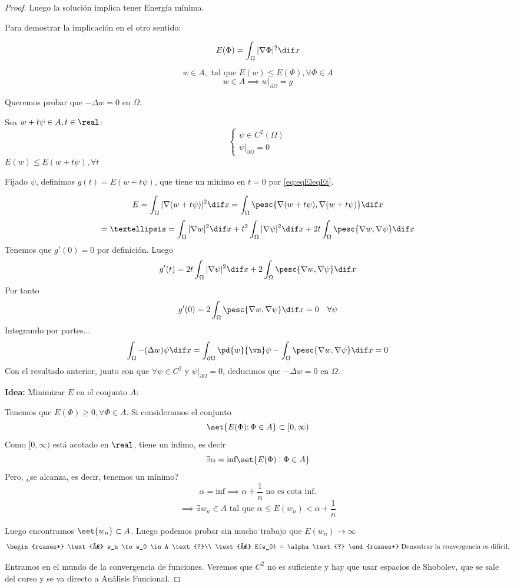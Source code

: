\begin{proof}
		Luego la solución implica tener Energía mínima.

		\proofpart{$\Longleftarrow$}

		Para demostrar la implicación en el otro sentido:

		\[ E(\Phi) = \int_\Omega |\nabla \Phi|^2 \dif x \]

		\[ w \in A, \text{ tal que } E(w) \leq E(\Phi), \forall \Phi \in A\]
		\[ w \in A \implies w|_{\partial \Omega} = g\]

		Queremos probar que $-\Delta w = 0$ en $\Omega$.

		Sea $w+t\psi \in A, t \in \real$:
		\[\begin{cases}
			\psi \in C^2(\Omega)\\
			\psi|_{\partial \Omega} = 0
	\end{cases}\]
		\( E(w) \leq E(w + t \psi), \forall t \label{eq:eqEleqEt} \)

		Fijado $\psi$, definimos $g(t) = E(w + t \psi)$, que tiene un mínimo en $t=0$ por \ref{eq:eqEleqEt}.

		\[E= \int_\Omega | \nabla (w+t\psi)|^2 \dif x = \int_\Omega \pesc{\nabla (w+t\psi), \nabla(w + t \psi)} \dif x\]
		\[ = … = \int_\Omega |\nabla w|^2 \dif x + t^2 \int_\Omega |\nabla \psi|^2 \dif x + 2t\int_\Omega \pesc{\nabla w, \nabla \psi} \dif x \]
		Tenemos que $g'(0) = 0$ por definición. Luego
		\[ g'(t) = 2t \int_\Omega | \nabla \psi |^2 \dif x + 2 \int_\Omega \pesc{\nabla w, \nabla \psi} \dif x \]
		Por tanto
		\[ g'(0) = 2 \int_\Omega \pesc{\nabla w, \nabla \psi} \dif x = 0 \quad \forall \psi \]
		Integrando por partes...
		\[ \int_\Omega -(\Delta w)\psi \dif x = \int_{\partial \Omega} \pd{w}{\vn} \psi - \int_\Omega \pesc{\nabla w, \nabla \psi} \dif x  = 0 \]
		Con el resultado anterior, junto con que $\forall \psi \in C^2$ y $\psi|_{\partial\Omega} = 0$, deducimos que $-\Delta w = 0$ en $\Omega$.

		\textbf{Idea:} Minimizar $E$ en el conjunto $A$:

		Tenemos que $E(\Phi) \geq 0, \forall \Phi \in A$. Si consideramos el conjunto
			\[ \set{ E(\Phi); \Phi \in A} \subset [0, \infty) \]
		Como $[0, \infty)$ está acotado en $\real$, tiene un ínfimo, es decir
		\[ \exists \alpha = \text{inf}\set{E(\Phi) : \Phi \in A} \]
		Pero, ¿se alcanza, es decir, tenemos un mínimo?
		\[ \alpha = \text{inf} \implies \alpha + \frac{1}{n} \text{ no es cota inf.} \]
		\[ \implies \exists w_n \in A \text{ tal que } \alpha \leq E(w_n) < \alpha + \frac{1}{n} \]

		Luego encontramos $\set{w_n} \subset A$. Luego podemos probar sin mucho trabajo que $E(w_n) \rightarrow \infty$
		\[ \begin{rcases*}
			\text{¿} w_n \to w_0 \in A \text{?}\\
			\text{¿} E(w_0) = \alpha \text{?}
		\end{rcases*} \text{ Demostrar la convergencia es difícil.}
		\]

		Entramos en el mundo de la convergencia de funciones. Veremos que $C^2$ no es suficiente y hay que usar espacios de Shobolev, que se sale del curso y se va directo a Análisis Funcional.
		\end{proof}


